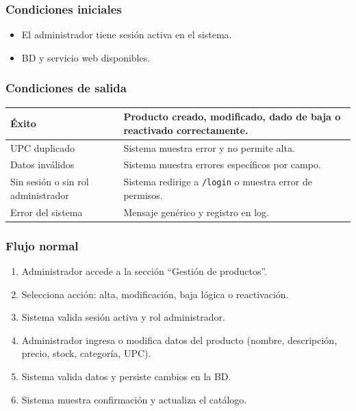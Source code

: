 \documentclass[12pt,a4paper]{article}
\begin{document}
\subsubsection*{Condiciones iniciales}
\begin{itemize}[label=--]
    \item El administrador tiene sesión activa en el sistema.
    \item BD y servicio web disponibles.
\end{itemize}

\subsubsection*{Condiciones de salida}
\begin{longtable}{|l|p{10cm}|}
    \hline
    Éxito                              & Producto creado, modificado, dado de baja o reactivado correctamente. \\ \hline
    UPC duplicado                      & Sistema muestra error y no permite alta.                              \\ \hline
    Datos inválidos                    & Sistema muestra errores específicos por campo.                        \\ \hline
    Sin sesión o sin rol administrador & Sistema redirige a \texttt{/login} o muestra error de permisos.       \\ \hline
    Error del sistema                  & Mensaje genérico y registro en log.                                   \\ \hline
\end{longtable}

\subsubsection*{Flujo normal}
\begin{enumerate}[label=FN-\arabic*]
    \item Administrador accede a la sección “Gestión de productos”.
    \item Selecciona acción: alta, modificación, baja lógica o reactivación.
    \item Sistema valida sesión activa y rol administrador.
    \item Administrador ingresa o modifica datos del producto (nombre, descripción, precio, stock, categoría, UPC).
    \item Sistema valida datos y persiste cambios en la BD.
    \item Sistema muestra confirmación y actualiza el catálogo.
\end{enumerate}
\end{document}
